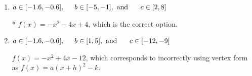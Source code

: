\documentclass{extbook}[14pt]
\begin{document}
\begin{enumerate}
{\begin{enumerate}[label=\Alph*.]
$f(x)=-x^{2} +4 x + 4$, which corresponds to incorrectly using vertex form as $f(x) = a(x+h)^2+k$.
\item \( a \in [-1.6, -0.6], \hspace*{5mm} b \in [-5, -1], \text{ and } \hspace*{5mm} c \in [2, 8] \)

* $f(x)=-x^{2} -4 x + 4$, which is the correct option.
\item \( a \in [-1.6, -0.6], \hspace*{5mm} b \in [1, 5], \text{ and } \hspace*{5mm} c \in [-12, -9] \)

$f(x)=-x^{2} +4 x -12$, which corresponds to incorrectly using vertex form as $f(x) = a(x+h)^2 - k$.
\end{enumerate}

}
\end{enumerate}
\end{document}

